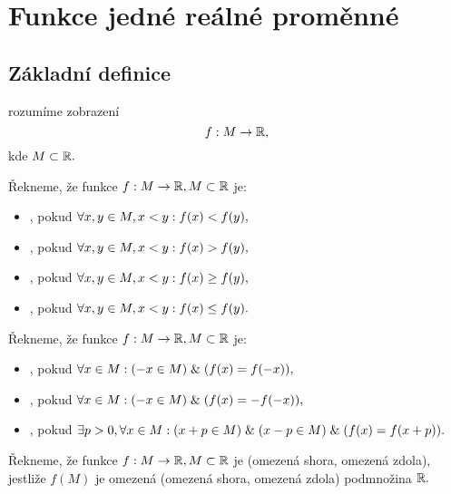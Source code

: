 \section{Funkce jedné reálné proměnné}

\subsection{Základní definice}

\begin{definition}
     rozumíme zobrazení
    $$f: M \rightarrow \mathbb{R},$$
    kde $M \subset \mathbb{R}.$
\end{definition}

\begin{definition}
    Řekneme, že funkce $f: M \rightarrow \mathbb{R}, M \subset \mathbb{R}$ je:
    \begin{itemize} 
        \item {}, pokud $\forall x,y \in M, x < y: f(x) < f(y),$
        \item {}, pokud $\forall x,y \in M, x < y: f(x) > f(y),$
        \item {}, pokud $\forall x,y \in M, x < y: f(x) \geq f(y),$
        \item {}, pokud $\forall x,y \in M, x < y: f(x) \leq f(y).$
    \end{itemize}
\end{definition}

\begin{definition}
    Řekneme, že funkce $f: M \rightarrow \mathbb{R}, M \subset \mathbb{R}$ je:
    \begin{itemize}
        \item {}, pokud $\forall x \in M: (-x \in M) \; \& \; (f(x) = f(-x)),$
        \item {}, pokud $\forall x \in M: (-x \in M) \; \& \; (f(x) =- f(-x)),$
        \item {}, pokud $\exists p > 0, \forall x \in M: (x+p \in M) \; \& \; 
            (x-p \in M) \; \& \; (f(x) = f(x+p)).$
    \end{itemize}
\end{definition}

\begin{definition}
    Řekneme, že funkce $f: M \rightarrow \mathbb{R}, M \subset \mathbb{R}$ je 
    (omezená shora, omezená zdola), jestliže $f(M)$ je omezená (omezená
    shora, omezená zdola) podmnožina $\mathbb{R}.$
\end{definition}

